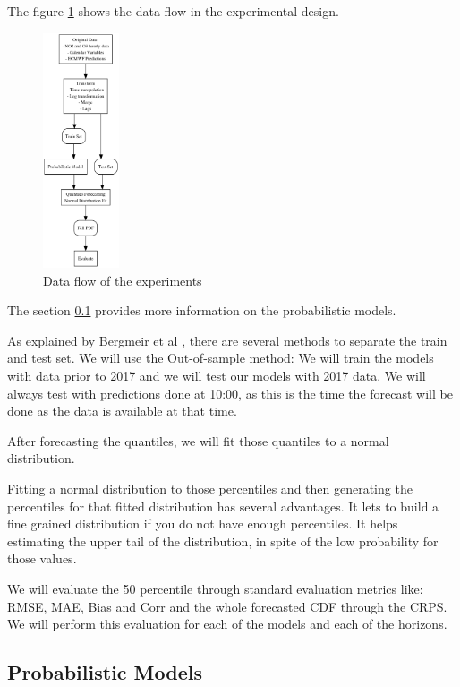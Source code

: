\documentclass[a4paper,twocolumn,5p]{elsarticle}
\begin{document}
The figure \ref{figure:dataflow} shows the data flow in the experimental design.  

\begin{figure}
  \centering
  \includegraphics[width=0.2\textwidth]{diagrams/flow}
  \caption{Data flow of the experiments}
  \label{figure:dataflow}
\end{figure}

The section \ref{sec:models} provides more information on the probabilistic models.

As explained by Bergmeir et al \cite{bergmeir_note_2018}, there are several methods
to separate the train and test set. We will use the Out-of-sample method:
We will train the models with data prior to 2017 and we will test our 
models with 2017 data. We will always test with 
predictions done at 10:00, as this is the time the 
forecast will be done as the data is available at that time.

After forecasting the quantiles, we will fit those quantiles to a normal distribution.

Fitting a normal distribution to those percentiles and then generating the 
percentiles for that fitted distribution has several advantages. It lets to build a 
fine grained distribution if you do not have enough percentiles.
It helps estimating the upper tail of the distribution, in spite of the 
low probability for 
those values.

We will evaluate the 50 percentile through standard evaluation metrics like: RMSE, MAE, 
Bias and Corr 
and the whole forecasted CDF through the CRPS. We will perform
this evaluation for each of the models and each of the horizons.

\subsection{Probabilistic Models}
\label{sec:models}
\end{document}
